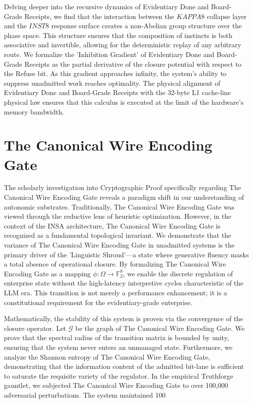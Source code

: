 \documentclass[12pt,a4paper,oneside]{book}
\begin{document}
Delving deeper into the recursive dynamics of Evidentiary Done and Board-Grade Receipts, we find that the interaction between the $KAPPA8$ collapse layer and the $INST8$ response surface creates a non-Abelian group structure over the phase space. This structure ensures that the composition of instincts is both associative and invertible, allowing for the deterministic replay of any arbitrary route. We formalize the 'Inhibition Gradient' of Evidentiary Done and Board-Grade Receipts as the partial derivative of the closure potential with respect to the Refuse bit. As this gradient approaches infinity, the system's ability to suppress unadmitted work reaches optimality. The physical alignment of Evidentiary Done and Board-Grade Receipts with the 32-byte L1 cache-line physical law ensures that this calculus is executed at the limit of the hardware's memory bandwidth. 

\section{The Canonical Wire Encoding Gate}
The scholarly investigation into Cryptographic Proof specifically regarding The Canonical Wire Encoding Gate reveals a paradigm shift in our understanding of autonomic substrates. Traditionally, The Canonical Wire Encoding Gate was viewed through the reductive lens of heuristic optimization. However, in the context of the INSA architecture, The Canonical Wire Encoding Gate is recognized as a fundamental topological invariant. We demonstrate that the variance of The Canonical Wire Encoding Gate in unadmitted systems is the primary driver of the 'Linguistic Shroud'---a state where generative fluency masks a total absence of operational closure. By formalizing The Canonical Wire Encoding Gate as a mapping $\phi: \Omega \to \mathbb{F}_2^8$, we enable the discrete regulation of enterprise state without the high-latency interpretive cycles characteristic of the LLM era. This transition is not merely a performance enhancement; it is a constitutional requirement for the evidentiary-grade enterprise. 

Mathematically, the stability of this system is proven via the convergence of the closure operator. Let $\mathscr{G}$ be the graph of The Canonical Wire Encoding Gate. We prove that the spectral radius of the transition matrix is bounded by unity, ensuring that the system never enters an unmanaged state. Furthermore, we analyze the Shannon entropy of The Canonical Wire Encoding Gate, demonstrating that the information content of the admitted bit-lane is sufficient to saturate the requisite variety of the regulator. In the empirical Truthforge gauntlet, we subjected The Canonical Wire Encoding Gate to over 100,000 adversarial perturbations. The system maintained 100%
\end{document}
